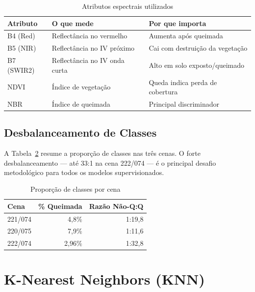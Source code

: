 \documentclass[conference]{IEEEtran}
\begin{document}
\begin{table}[!t]
  \caption{Atributos espectrais utilizados}
  \label{tab:features_geral}
  \centering
  \begin{tabular}{lll}
    \toprule
    \textbf{Atributo} & \textbf{O que mede} & \textbf{Por que importa} \\
    \midrule
    B4 (Red)   & Reflectância no vermelho       & Aumenta após queimada \\
    B5 (NIR)   & Reflectância no IV próximo     & Cai com destruição da vegetação \\
    B7 (SWIR2) & Reflectância no IV onda curta  & Alto em solo exposto/queimado \\
    NDVI       & Índice de vegetação            & Queda indica perda de cobertura \\
    NBR        & Índice de queimada             & Principal discriminador \\
    \bottomrule
  \end{tabular}
\end{table}

\subsection{Desbalanceamento de Classes}

A Tabela~\ref{tab:imbalance_geral} resume a proporção de classes nas três
cenas. O forte desbalanceamento — até 33:1 na cena 222/074 — é o principal
desafio metodológico para todos os modelos supervisionados.

\begin{table}[!t]
  \caption{Proporção de classes por cena}
  \label{tab:imbalance_geral}
  \centering
  \begin{tabular}{lrr}
    \toprule
    \textbf{Cena} & \textbf{\% Queimada} & \textbf{Razão Não-Q:Q} \\
    \midrule
    221/074 & 4,8\%  & 1:19,8 \\
    220/075 & 7,9\%  & 1:11,6 \\
    222/074 & 2,96\% & 1:32,8 \\
    \bottomrule
  \end{tabular}
\end{table}

\section{K-Nearest Neighbors (KNN)}
\end{document}
